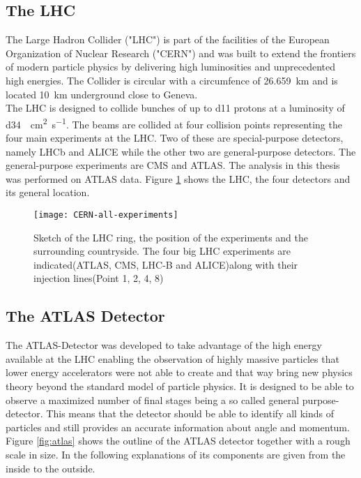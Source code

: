 \subsection{The LHC}

The Large Hadron Collider ("LHC") is part of the facilities of the European Organization of Nuclear Research ("CERN") and was built to extend the frontiers of modern particle physics by delivering high luminosities and unprecedented high energies. The Collider is circular with a circumfence of \SI{26.659}{\km} and is located \SI{10}{\km} underground close to Geneva.\\
The LHC is designed to collide bunches of up to \num{d11} protons at a luminosity of \SI{d34}{\per\square\cm \per\s}. The beams are collided at four collision points representing the four main experiments at the LHC. Two of these are special-purpose detectors, namely LHCb and ALICE while the other two are general-purpose detectors.
The general-purpose experiments are CMS and ATLAS. The analysis in this thesis was performed on ATLAS data.
Figure \ref{fig:LHC} shows the LHC, the four detectors and its general location.
\begin{figure}[h]
  \centering
  \texttt{[image: CERN-all-experiments]}
  \caption[Sketch of the LHC ring, the position of the experiments and
  the surrounding countryside.]{Sketch of the LHC ring, the position
    of the experiments and the surrounding countryside. The four big
    LHC experiments are indicated(ATLAS, CMS, LHC-B and ALICE)along with their injection lines(Point 1, 2, 4, 8)\cite{atlasfigures}}
  \label{fig:LHC}
\end{figure}


\subsection{The ATLAS Detector}

The ATLAS-Detector was developed to take advantage of the high energy available at the LHC enabling the observation of highly massive particles that lower energy accelerators were not able to create and that way bring new physics theory beyond the standard model of particle physics.
It is designed to be able to observe a maximized number of final stages being a so called general purpose-detector. This means that the detector should be able to identify all kinds of particles and still provides an accurate information about angle and momentum.
Figure \ref{fig:atlas} shows the outline of the ATLAS detector together with a rough scale in size. In the following explanations of its components are given from the inside to the outside.

